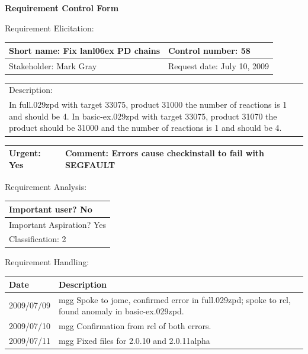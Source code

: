 \begin{center}\Large\bf
Requirement Control Form
\end{center}
\vspace{24pt}

Requirement Elicitation:

\begin{tabular}{|p{211pt}|p{211pt}|} \hline
Short name: Fix lanl06ex PD chains & Control number: 58\\ \hline
Stakeholder: Mark Gray & Request date: July 10, 2009\\
\end{tabular}
\begin{tabular}{|p{433pt}|} \hline
Description: \\ 
In full.029zpd with target 33075, product 31000 the number of
reactions is 1 and should be 4.  In basic-ex.029zpd with target 33075,
product 31070 the product should be 31000 and the number of reactions
is 1 and should be 4.
\\ \hline
\end{tabular} 
\begin{tabular}{|p{211pt}|p{211pt}|} \hline
Urgent: Yes & Comment: Errors cause checkinstall to fail with SEGFAULT
\\ \hline
\end{tabular}

\vspace{24pt}

Requirement Analysis:

\begin{tabular}{|p{433pt}|} \hline
Important user? No \\ \hline
Important Aspiration? Yes \\ \hline
Classification: 2 \\ \hline
\end{tabular}
\vspace{24pt}

Requirement Handling:

\begin{tabular}{|p{72pt}|p{351pt}|} \hline
Date & Description \\ \hline
2009/07/09 & mgg Spoke to jomc, confirmed error in full.029zpd; spoke
to rcl, found anomaly in basic-ex.029zpd. \\ \hline
2009/07/10 & mgg Confirmation from rcl of both errors. \\ \hline
2009/07/11 & mgg Fixed files for 2.0.10 and 2.0.11alpha \\ \hline
\end{tabular}
